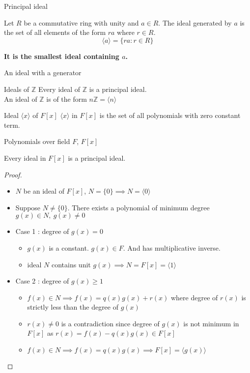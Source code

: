 \documentclass{beamer}
\begin{document}
\begin{frame}{Principal ideal}
\begin{definition}
	Let $R$ be a commutative ring with unity and $a \in R$. The ideal generated by $a$ is the set of all elements of the form $ra$ where $r \in R$.
	$$ \langle a \rangle = \{ ra : r \in R \}$$
\end{definition}
\begin{center}\textbf{It is the smallest ideal containing $a$.}\end{center}
\begin{definition}
	An ideal with a generator
\end{definition}
\begin{exampleblock}{Ideals of $\mathbb{Z}$}
	Every ideal of $\mathbb{Z}$ is a principal ideal.\\
	An ideal of $\mathbb{Z}$ is of the form $n\mathbb{Z} = \langle n \rangle$
\end{exampleblock}
\begin{exampleblock}{Ideal $\langle x \rangle$ of $F[x]$}
	$\langle x \rangle$ in $F[x]$ is the set of all polynomials with zero constant term.
\end{exampleblock}
\end{frame}

\begin{frame}{Polynomials over field $F$, $F[x]$}
\begin{theorem}
	Every ideal in $F[x]$ is a principal ideal.
\end{theorem}
\begin{proof}
\begin{itemize}
	\item $N$ be an ideal of $F[x]$, $N = \{ 0 \} \implies N = \langle 0 \rangle$
	\item Suppose $N \ne \{ 0 \}$. There exists a polynomial of minimum degree $g(x) \in N,\ g(x) \ne 0$
	\item Case 1 : degree of $g(x) = 0$
	\begin{itemize}
		\item $g(x)$ is a constant. $g(x) \in F$. And has multiplicative inverse.
		\item ideal $N$ contains unit $g(x) \implies N = F[x] = \langle 1 \rangle$
	\end{itemize}
	\item Case 2 : degree of $g(x) \ge 1$
	\begin{itemize}
		\item  $f(x) \in N \implies f(x) = q(x)g(x) + r(x)$ where degree of $r(x)$ is strictly less than the degree of $g(x)$\\
		\item $r(x) \ne 0$ is a contradiction since degree of $g(x)$ is not minimum in $F[x]$ as $r(x) = f(x)-q(x)g(x) \in F[x]$
		\item $f(x) \in N \implies f(x) = q(x)g(x) \implies F[x] = \langle g(x) \rangle$ 
	\end{itemize}
\end{itemize}
\end{proof}
\end{frame}
\end{document}
